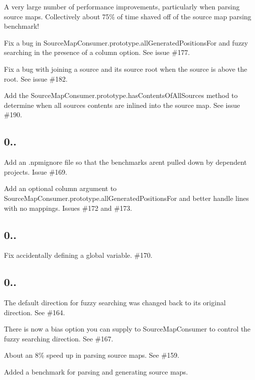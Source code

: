 \begin{DoxyItemize}
\item A very large number of performance improvements, particularly when parsing source maps. Collectively about 75\% of time shaved off of the source map parsing benchmark!
\item Fix a bug in {\ttfamily Source\+Map\+Consumer.\+prototype.\+all\+Generated\+Positions\+For} and fuzzy searching in the presence of a column option. See issue \#177.
\item Fix a bug with joining a source and its source root when the source is above the root. See issue \#182.
\item Add the {\ttfamily Source\+Map\+Consumer.\+prototype.\+has\+Contents\+Of\+All\+Sources} method to determine when all sources\textquotesingle{} contents are inlined into the source map. See issue \#190.
\end{DoxyItemize}

\subsection*{0..}


\begin{DoxyItemize}
\item Add an {\ttfamily .npmignore} file so that the benchmarks aren\textquotesingle{}t pulled down by dependent projects. Issue \#169.
\item Add an optional {\ttfamily column} argument to {\ttfamily Source\+Map\+Consumer.\+prototype.\+all\+Generated\+Positions\+For} and better handle lines with no mappings. Issues \#172 and \#173.
\end{DoxyItemize}

\subsection*{0..}


\begin{DoxyItemize}
\item Fix accidentally defining a global variable. \#170.
\end{DoxyItemize}

\subsection*{0..}


\begin{DoxyItemize}
\item The default direction for fuzzy searching was changed back to its original direction. See \#164.
\item There is now a {\ttfamily bias} option you can supply to {\ttfamily Source\+Map\+Consumer} to control the fuzzy searching direction. See \#167.
\item About an 8\% speed up in parsing source maps. See \#159.
\item Added a benchmark for parsing and generating source maps.
\end{DoxyItemize}

